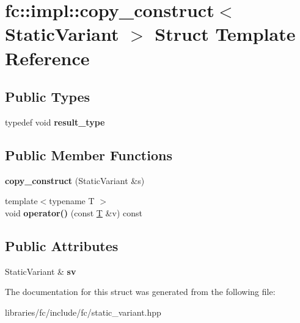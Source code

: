 \hypertarget{structfc_1_1impl_1_1copy__construct}{}\section{fc\+:\+:impl\+:\+:copy\+\_\+construct$<$ Static\+Variant $>$ Struct Template Reference}
\label{structfc_1_1impl_1_1copy__construct}
\subsection*{Public Types}
\begin{DoxyCompactItemize}
\item 
\mbox{\label{structfc_1_1impl_1_1copy__construct_a95e1657238dc59a50583c51f624eec65}} 
typedef void {\bfseries result\+\_\+type}
\end{DoxyCompactItemize}
\subsection*{Public Member Functions}
\begin{DoxyCompactItemize}
\item 
\mbox{\label{structfc_1_1impl_1_1copy__construct_a65dcef91622cf7b45f25b376fbe9ac67}} 
{\bfseries copy\+\_\+construct} (Static\+Variant \&s)
\item 
\mbox{\label{structfc_1_1impl_1_1copy__construct_a6885670b9d7d894394f208d7a8119c56}} 
{\footnotesize template$<$typename T $>$ }\\void {\bfseries operator()} (const \mbox{\hyperlink{struct_t}{T}} \&v) const
\end{DoxyCompactItemize}
\subsection*{Public Attributes}
\begin{DoxyCompactItemize}
\item 
\mbox{\label{structfc_1_1impl_1_1copy__construct_a184a94fc7322248333317d490b74cef9}} 
Static\+Variant \& {\bfseries sv}
\end{DoxyCompactItemize}


The documentation for this struct was generated from the following file\+:\begin{DoxyCompactItemize}
\item 
libraries/fc/include/fc/static\+\_\+variant.\+hpp\end{DoxyCompactItemize}
